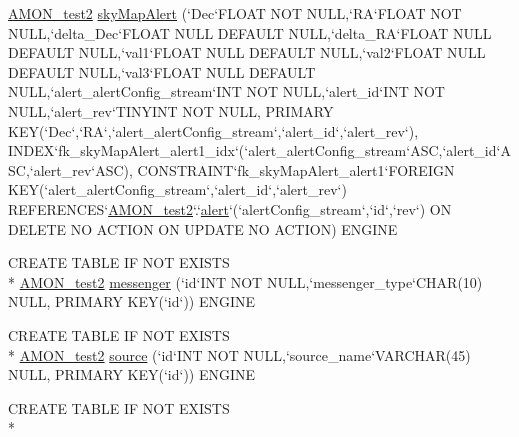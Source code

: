 \begin{DoxyCompactItemize}
\hyperlink{db__mc__build_8sql_a19c21c59303d8b6591b92240ff7de1d5}{A\-M\-O\-N\-\_\-test2} \hyperlink{db__mc__build_8sql_a9df07a3947bd91a160933bfe932c084b}{sky\-Map\-Alert} (`Dec`F\-L\-O\-A\-T N\-O\-T N\-U\-L\-L,`R\-A`F\-L\-O\-A\-T N\-O\-T N\-U\-L\-L,`delta\-\_\-\-Dec`F\-L\-O\-A\-T N\-U\-L\-L D\-E\-F\-A\-U\-L\-T N\-U\-L\-L,`delta\-\_\-\-R\-A`F\-L\-O\-A\-T N\-U\-L\-L D\-E\-F\-A\-U\-L\-T N\-U\-L\-L,`val1`F\-L\-O\-A\-T N\-U\-L\-L D\-E\-F\-A\-U\-L\-T N\-U\-L\-L,`val2`F\-L\-O\-A\-T N\-U\-L\-L D\-E\-F\-A\-U\-L\-T N\-U\-L\-L,`val3`F\-L\-O\-A\-T N\-U\-L\-L D\-E\-F\-A\-U\-L\-T N\-U\-L\-L,`alert\-\_\-alert\-Config\-\_\-stream`I\-N\-T N\-O\-T N\-U\-L\-L,`alert\-\_\-id`I\-N\-T N\-O\-T N\-U\-L\-L,`alert\-\_\-rev`T\-I\-N\-Y\-I\-N\-T N\-O\-T N\-U\-L\-L, P\-R\-I\-M\-A\-R\-Y K\-E\-Y(`Dec`,`R\-A`,`alert\-\_\-alert\-Config\-\_\-stream`,`alert\-\_\-id`,`alert\-\_\-rev`), I\-N\-D\-E\-X`fk\-\_\-sky\-Map\-Alert\-\_\-alert1\-\_\-idx`(`alert\-\_\-alert\-Config\-\_\-stream`A\-S\-C,`alert\-\_\-id`A\-S\-C,`alert\-\_\-rev`A\-S\-C), C\-O\-N\-S\-T\-R\-A\-I\-N\-T`fk\-\_\-sky\-Map\-Alert\-\_\-alert1`F\-O\-R\-E\-I\-G\-N K\-E\-Y(`alert\-\_\-alert\-Config\-\_\-stream`,`alert\-\_\-id`,`alert\-\_\-rev`) R\-E\-F\-E\-R\-E\-N\-C\-E\-S`\hyperlink{db__mc__build_8sql_a19c21c59303d8b6591b92240ff7de1d5}{A\-M\-O\-N\-\_\-test2}`.`\hyperlink{db__mc__build_8sql_a38a604686c7d372f50752e893e3e1e21}{alert}`(`alert\-Config\-\_\-stream`,`id`,`rev`) O\-N D\-E\-L\-E\-T\-E N\-O A\-C\-T\-I\-O\-N O\-N U\-P\-D\-A\-T\-E N\-O A\-C\-T\-I\-O\-N) E\-N\-G\-I\-N\-E
\item 
C\-R\-E\-A\-T\-E T\-A\-B\-L\-E I\-F N\-O\-T E\-X\-I\-S\-T\-S \\*
\hyperlink{db__mc__build_8sql_a19c21c59303d8b6591b92240ff7de1d5}{A\-M\-O\-N\-\_\-test2} \hyperlink{db__mc__build_8sql_a2eb25ad52c04da73aa8331b9c9d29cce}{messenger} (`id`I\-N\-T N\-O\-T N\-U\-L\-L,`messenger\-\_\-type`C\-H\-A\-R(10) N\-U\-L\-L, P\-R\-I\-M\-A\-R\-Y K\-E\-Y(`id`)) E\-N\-G\-I\-N\-E
\item 
C\-R\-E\-A\-T\-E T\-A\-B\-L\-E I\-F N\-O\-T E\-X\-I\-S\-T\-S \\*
\hyperlink{db__mc__build_8sql_a19c21c59303d8b6591b92240ff7de1d5}{A\-M\-O\-N\-\_\-test2} \hyperlink{db__mc__build_8sql_a2da1ba01fa2a751239f57c1c5fbcecc8}{source} (`id`I\-N\-T N\-O\-T N\-U\-L\-L,`source\-\_\-name`V\-A\-R\-C\-H\-A\-R(45) N\-U\-L\-L, P\-R\-I\-M\-A\-R\-Y K\-E\-Y(`id`)) E\-N\-G\-I\-N\-E
\item 
C\-R\-E\-A\-T\-E T\-A\-B\-L\-E I\-F N\-O\-T E\-X\-I\-S\-T\-S \\*

\end{DoxyCompactItemize}
